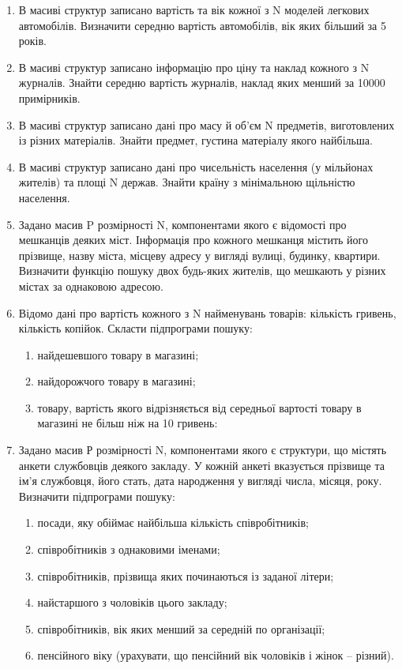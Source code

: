 \documentclass[a5paper,titlepage,openany,twoside,
]
{book_unv}%
\makeatletter
\newcommand{\xslalph}[1]{\expandafter\@xslalph\csname c@#1\endcsname}
\newcommand{\@xslalph}[1]{%
    \ifcase#1\or а\or б\or в\or г\or д\or e\or є\or ж\or з\or i%
    \or й\or к\or л\or м\or н\or о\or п\or р\or с\or т%
    \or у\or ф\or х\or ц\or ч\or ш\or ю\or я\or аа\or бб\or вв%
    \else\@ctrerr\fi%
}
\makeatother
\begin{document}
\begin{enumerate}
\item
  В масиві структур записано вартість та вік кожної з N моделей легкових
  автомобілів. Визначити середню вартість автомобілів, вік яких більший
  за 5 років.
\item
  В масиві структур записано інформацію про ціну та наклад кожного з N
  журналів. Знайти середню вартість журналів, наклад яких менший за
  10000 примірників.
\item
  В масиві структур записано дані про масу й об'єм N предметів,
  виготовлених із різних матеріалів. Знайти предмет, густина матеріалу
  якого найбільша.
\item
  В масиві структур записано дані про чисельність населення (у мільйонах
  жителів) та площі N держав. Знайти країну з мінімальною щільністю
  населення.
\item
  Задано масив P розмірності N, компонентами якого є відомості про
  мешканців деяких міст. Інформація про кожного мешканця містить його
  прізвище, назву міста, місцеву адресу у вигляді вулиці, будинку,
  квартири. Визначити функцію пошуку двох будь-яких жителів, що мешкають
  у різних містах за однаковою адресою.
\item
  Відомо дані про вартість кожного з N найменувань товарів: кількість
  гривень, кількість копійок. Скласти підпрограми пошуку:
\begin{enumerate}[label=\xslalph*)]
\item найдешевшого товару в магазині;
\item найдорожчого товару в магазині;
\item товару, вартість якого відрізняється від середньої вартості 
товару в магазині не більш ніж на 10 гривень:

\end{enumerate}

\item
  Задано масив Р розмірності N, компонентами якого є структури, що
  містять анкети службовців деякого закладу. У кожній анкеті вказується
  прізвище та ім'я службовця, його стать, дата народження у вигляді
  числа, місяця, року. Визначити підпрограми пошуку:
\begin{enumerate}[label=\xslalph*)]
\item посади, яку обіймає найбільша кількість співробітників;
\item співробітників з однаковими іменами;
\item співробітників, прізвища яких починаються із заданої літери;
\item найстаршого з чоловіків цього закладу;
\item співробітників, вік яких менший за середній по організації;
\item пенсійного віку (урахувати, що пенсійний вік чоловіків і жінок --
різний).
\end{enumerate}


\end{enumerate}
\end{document}
